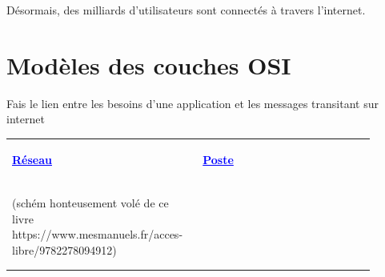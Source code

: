 Désormais, des milliards d'utilisateurs sont connectés à travers l'internet.

\section{Modèles des couches OSI}

Fais le lien entre les besoins d'une application et les messages transitant sur internet

\begin{tabular}{p{0.45\linewidth}:p{0.45\linewidth}}
	\begin{center}
		\textbf{\textcolor{blue}{\underline{Réseau}}}
	\end{center} &
	\begin{center}
	\textbf{\textcolor{blue}{\underline{Poste}}}
	\end{center} \\
	&\\
	
	\begin{minipage}{\linewidth}
		\includegraphics[width=\linewidth]{lecon/26-architecture-internet/schema_osi.png} \\ \\
		(schém honteusement volé de ce livre https://www.mesmanuels.fr/acces-libre/9782278094912)
	\end{minipage} &  \\
	& \\ \hdashline
	

\end{tabular}
